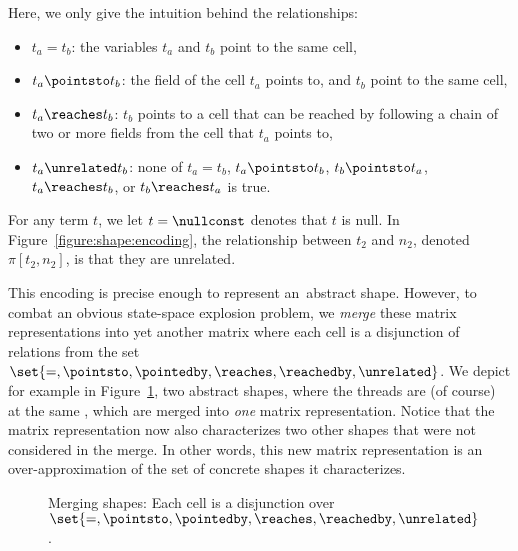 \newpage%
Here, we only give the intuition behind the relationships:
%
\begin{itemize}[leftmargin=*]
\item $t_a = t_b$: the variables $t_a$ and $t_b$ point to the same cell,
\item $t_a \pointsto t_b$: the  field of the cell $t_a$
  points to, and $t_b$ point to the same cell,
\item $t_a\reaches t_b$: $t_b$ points to a cell that can be reached by
  following a chain of two or more  fields from the cell
  that $t_a$ points to,
\item
  $t_a \unrelated t_b$: none of 
  $t_a = t_b$, %
  $t_a \pointsto t_b$, %
  $t_b \pointsto t_a$, %
  $t_a \reaches t_b$, or %
  $t_b \reaches t_a$ is true.
\end{itemize}
%
For any term $t$, we let $t=\nullconst$ denotes that $t$ is
null. %
%
In Figure~\ref{figure:shape:encoding}, the relationship between $t_2$
and $n_2$, denoted $\pi[t_2,n_2]$, is that they are unrelated.

This encoding is precise enough to represent an~abstract
shape. However, to combat an obvious state-space explosion problem, we
\emph{merge} these matrix representations into yet another matrix
where each cell is a disjunction of relations from the set
$\set{=,\pointsto,\pointedby,\reaches,\reachedby,\unrelated}$.
%
We depict for example in Figure~\ref{figure:shape:merging}, two
abstract shapes, where the threads are (of course) at the same
, which are merged into \emph{one} matrix
representation. Notice that the matrix representation now also
characterizes two other shapes that were not considered in the
merge. In other words, this new matrix representation is an
over-approximation of the set of concrete shapes it characterizes.

\begingroup%
\setlength\intextsep{\dazintextsep}
\begin{figure}[ht]
  \caption{Merging shapes: Each cell is a disjunction over
    $\set{=,\pointsto,\pointedby,\reaches,\reachedby,\unrelated}$.}
  \label{figure:shape:merging}
\end{figure}
\endgroup

